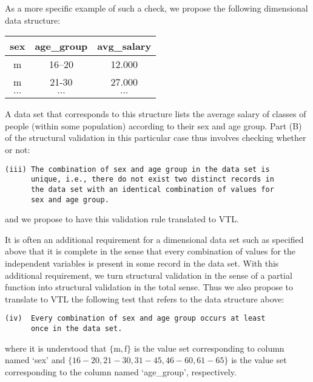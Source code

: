 As a more specific example of such a check, we propose the following dimensional data structure:
\begin{center}
\begin{tabular}[c]{|c|c|c|}
\hline
sex & age\_group & avg\_salary \\
\hline
\hline
m & 16--20 & 12.000\\
\hline
m & 21-30 & 27.000\\
\hline
$\cdots$ & $\cdots$ & $\cdots$\\
\hline
\end{tabular}
\end{center}
A data set that corresponds to this structure lists the average salary of classes of people (within some population) according to their sex and age group. Part (B) of the structural validation in this particular case thus involves checking whether or not: 
\begin{verbatim}
(iii) The combination of sex and age group in the data set is
      unique, i.e., there do not exist two distinct records in
      the data set with an identical combination of values for
      sex and age group.
\end{verbatim}
and we propose to have this validation rule translated to VTL.

It is often an additional requirement for a dimensional data set such as specified above that it is complete in the sense that every combination of values for the independent variables is present in some record in the data set. With this additional requirement, we turn structural validation in the sense of a partial function into structural validation in the total sense. Thus we also propose to translate to VTL the following test that refers to the data structure above:
\begin{verbatim}
(iv)  Every combination of sex and age group occurs at least
      once in the data set.
\end{verbatim}
where it is understood that $\{\mathrm{m},\mathrm{f}\}$ is the value set corresponding to column named `sex' and $\{16-20, 21-30, 31-45, 46-60, 61-65\}$ is the value set corresponding to the column named `age\_group', respectively. 

